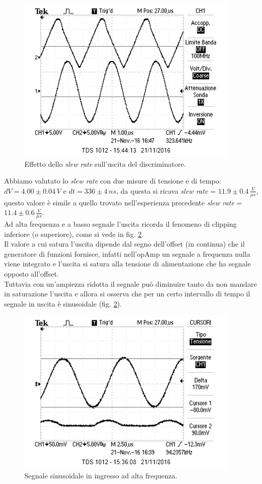 \documentclass[10pt,a4paper]{article}
\begin{document}
\begin{figure}[h]
\centering
\includegraphics[scale=1.0]{immagini/slewRate.png}
\caption{Effetto dello \emph{slew rate} sull'uscita del discriminatore.}
\label{slewRate}
\end{figure}

Abbiamo valutato lo \emph{slew rate} con due misure di tensione e di tempo: $dV = 4.00 \pm 0.04 \, V$ e $dt = 336 \pm 4 \, ns$, da questa si ricava \emph{slew rate} = $11.9 \pm 0.4 \, \frac{V}{\mu s}$, questo valore è simile a quello trovato nell'esperienza precedente \emph{slew rate} = $11.4 \pm 0.6 \, \frac{V}{\mu s}$.\\

Ad alta frequenza e a basso segnale l'uscita ricorda il fenomeno di clipping inferiore (o superiore), come si vede in fig. \ref{clipping}.\\
Il valore a cui satura l'uscita dipende dal segno dell'offset (in continua) che il generatore di funzioni fornisce, infatti nell'opAmp un segnale a frequenza nulla viene integrato e l'uscita si satura alla tensione di alimentazione che ha segnale opposto all'offset.\\
Tuttavia con un'ampiezza ridotta il segnale può diminuire tanto da non mandare in saturazione l'uscita e allora si osserva che per un certo intervallo di tempo il segnale in uscita è sinusoidale (fig. \ref{clipping}).\\

\begin{figure}[h]
\centering
\includegraphics[scale=1.0]{immagini/prodottoBandaGuadagno2.png}
\caption{Segnale sinusoidale in ingresso ad alta frequenza.}
\label{clipping}
\end{figure}
\end{document}
